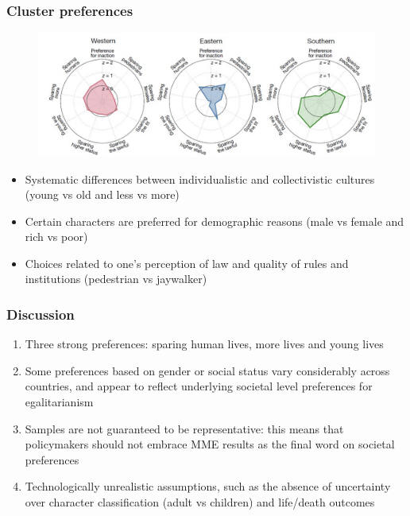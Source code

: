 \documentclass[aspectratio=169]{beamer}
\begin{document}
\begin{frame}
    \frametitle{Cluster preferences}
    \begin{figure}
        \center
        \includegraphics[width=0.8\linewidth]{assets/clusters-mme.jpg}
    \end{figure}
    \bigskip
    \begin{itemize}
        \item Systematic differences between individualistic and collectivistic cultures (young vs old and less vs more)
        \item Certain characters are preferred for demographic reasons (male vs female and rich vs poor)
        \item Choices related to one's perception of law and quality of rules and institutions (pedestrian vs jaywalker)
    \end{itemize}
\end{frame}

\begin{frame}
    \frametitle{Discussion}
    \begin{enumerate}
        \item Three strong preferences: sparing human lives, more lives and young lives
        \item Some preferences based on gender or social status vary considerably across countries, and appear to reflect underlying societal level preferences for egalitarianism
        \item Samples are not guaranteed to be representative: this means that policymakers should not embrace MME results as the final word on societal preferences
        \item Technologically unrealistic assumptions, such as the absence of uncertainty over character classification (adult vs children) and life/death outcomes 
    \end{enumerate}
\end{frame}
\end{document}
